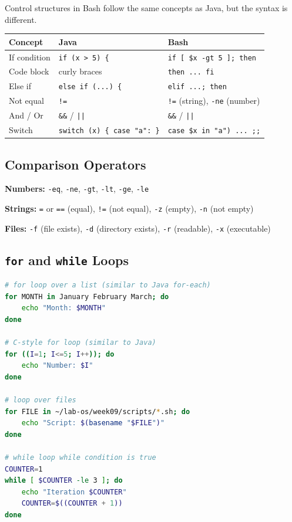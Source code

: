 Control structures in Bash follow the same concepts as Java, but the syntax is
different.

\begin{center}
\begin{tabular}{lll}
\hline
\textbf{Concept} & \textbf{Java} & \textbf{Bash} \\
\hline
If condition & \texttt{if (x > 5) \{} & \texttt{if [ \$x -gt 5 ]; then} \\
Code block & curly braces & \texttt{then ... fi} \\
Else if & \texttt{else if (...) \{} & \texttt{elif ...; then} \\
Not equal & \texttt{!=} & \texttt{!=} (string), \texttt{-ne} (number) \\
And / Or & \texttt{\&\&} / \texttt{||} & \texttt{\&\&} / \texttt{||} \\
Switch & \texttt{switch (x) \{ case "a": \}} & \texttt{case \$x in "a") ... ;;} \\
\hline
\end{tabular}
\end{center}

\subsection*{Comparison Operators}

\textbf{Numbers:} \texttt{-eq}, \texttt{-ne}, \texttt{-gt}, \texttt{-lt},
\texttt{-ge}, \texttt{-le}

\textbf{Strings:} \texttt{=} or \texttt{==} (equal), \texttt{!=} (not
equal), \texttt{-z} (empty), \texttt{-n} (not empty)

\textbf{Files:} \texttt{-f} (file exists), \texttt{-d} (directory exists),
\texttt{-r} (readable), \texttt{-x} (executable)

\subsection*{\texttt{for} and \texttt{while} Loops}

\begin{lstlisting}[language=bash, caption={for and while loops}]
# for loop over a list (similar to Java for-each)
for MONTH in January February March; do
    echo "Month: $MONTH"
done

# C-style for loop (similar to Java)
for ((I=1; I<=5; I++)); do
    echo "Number: $I"
done

# loop over files
for FILE in ~/lab-os/week09/scripts/*.sh; do
    echo "Script: $(basename "$FILE")"
done

# while loop while condition is true
COUNTER=1
while [ $COUNTER -le 3 ]; do
    echo "Iteration $COUNTER"
    COUNTER=$((COUNTER + 1))
done
\end{lstlisting}


